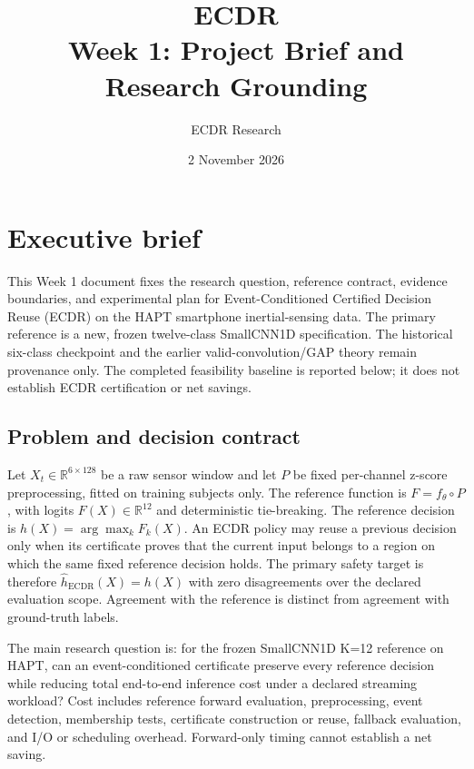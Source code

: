 \documentclass[11pt,a4paper]{article}
\begin{document}
\title{\textcolor{ink}{ECDR}\\[5pt]\Large Week 1: Project Brief and Research Grounding}
\author{ECDR Research}\date{2 November 2026}
\maketitle\tableofcontents\clearpage
\section{Executive brief}
This Week 1 document fixes the research question, reference contract, evidence
boundaries, and experimental plan for Event-Conditioned Certified Decision
Reuse (ECDR)
on the HAPT smartphone inertial-sensing data. The primary reference is a new,
frozen twelve-class SmallCNN1D specification. The historical six-class
checkpoint and the earlier valid-convolution/GAP theory remain provenance only.
The completed feasibility baseline is reported below; it does not establish
ECDR certification or net savings.

\subsection{Problem and decision contract}
Let $X_t\in\mathbb R^{6\times128}$ be a raw sensor window and let $P$ be
fixed per-channel z-score preprocessing, fitted on training subjects only. The
reference function is $F=f_\theta\circ P$, with logits $F(X)\in\mathbb R^{12}$
and deterministic tie-breaking. The reference decision is
$h(X)=\arg\max_k F_k(X)$. An ECDR policy may reuse a previous decision only
when its certificate proves that the current input belongs to a region on
which the same fixed reference decision holds. The primary safety target is
therefore $\hat h_{\mathrm{ECDR}}(X)=h(X)$ with zero disagreements over the
declared evaluation scope. Agreement with the reference is distinct from
agreement with ground-truth labels.

The main research question is: for the frozen SmallCNN1D K=12 reference on
HAPT, can an event-conditioned certificate preserve every reference decision
while reducing total end-to-end inference cost under a declared streaming
workload? Cost includes reference forward evaluation, preprocessing, event
detection, membership tests, certificate construction or reuse, fallback
evaluation, and I/O or scheduling overhead. Forward-only timing cannot
establish a net saving.
\end{document}
